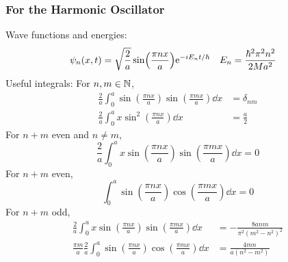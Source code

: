 \documentclass[../notes.tex]{subfiles}
\begin{document}
\subsubsection*{For the Harmonic Oscillator}
Wave functions and energies:
\begin{align*}
    \psi_n(x,t) &= \sqrt{\frac{2}{a}}\sin(\frac{\pi nx}{a})\e[-iE_nt/\hbar]&
    E_n &= \frac{\hbar^2\pi^2n^2}{2Ma^2}
\end{align*}
Useful integrals: For $n,m\in\N$,
\begin{align*}
    \frac{2}{a}\int_0^a\sin(\frac{\pi nx}{a})\sin(\frac{\pi mx}{a})\dd{x} &= \delta_{nm}\\
    \frac{2}{a}\int_0^ax\sin^2(\frac{\pi nx}{a})\dd{x} &= \frac{a}{2}
\end{align*}
For $n+m$ even and $n\neq m$,
\begin{equation*}
    \frac{2}{a}\int_0^ax\sin(\frac{\pi nx}{a})\sin(\frac{\pi mx}{a})\dd{x} = 0
\end{equation*}
For $n+m$ even,
\begin{equation*}
    \int_0^a\sin(\frac{\pi nx}{a})\cos(\frac{\pi mx}{a})\dd{x} = 0
\end{equation*}
For $n+m$ odd,
\begin{align*}
    \frac{2}{a}\int_0^ax\sin(\frac{\pi nx}{a})\sin(\frac{\pi mx}{a})\dd{x} &= -\frac{8anm}{\pi^2(m^2-n^2)^2}\\
    \frac{\pi m}{a}\frac{2}{a}\int_0^a\sin(\frac{\pi nx}{a})\cos(\frac{\pi mx}{a})\dd{x} &= \frac{4mn}{a(n^2-m^2)}
\end{align*}
\end{document}
